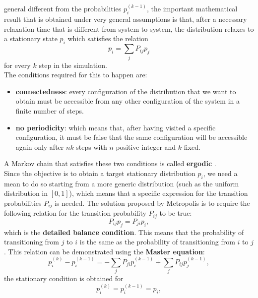 general different from the probabilities $p_i^{(k-1)}$, the important mathematical result that is obtained under very general assumptions is that, 
after a necessary relaxation time that is different from system to system, the distribution relaxes to a stationary state $p_i$ which satisfies the 
relation
\begin{equation}
    p_i=\sum_{j}P_{ij}p_j
\end{equation}
for every $k$ step in the simulation.\\
The conditions required for this to happen are:
\begin{itemize}
    \item \textbf{connectedness}: every configuration of the distribution that we want to obtain must be accessible from any other configuration of the system in a finite number of steps.
    \item \textbf{no periodicity}: which means that, after having visited a specific configuration, it must be false that the same configuration will be accessible again only after 
    $nk$ steps with $n$ positive integer and $k$ fixed.
\end{itemize}
A Markov chain that satisfies these two conditions is called \textbf{ergodic} \cite{gubernatis2016quantum}.\\
Since the objective is to obtain a target stationary distribution $p_i$, we need a mean to do so starting from a more generic distribution (such as the uniform distribution 
in $[0,1]$), which means that a specific expression for the transition probabilities $P_{ij}$ is needed. The solution proposed 
by Metropolis \cite{metropolis1953equation} is to require the following relation for the transition probability $P_{ij}$ to be true:
\begin{equation}
    P_{ij}p_j=P_{ji}p_i,
    \label{detailed_balance_condition}
\end{equation}
which is the \textbf{detailed balance condition}. This means that the probability of transitioning from $j$ to $i$ is the same as 
the probability of transitioning from $i$ to $j$. This relation can be demonstrated using the \textbf{Master equation}:
\begin{equation}
    p_i^{(k)}-p_{i}^{(k-1)}=-\sum_{j}P_{ji}p_{i}^{(k-1)}+\sum_{j}P_{ij}p_{j}^{(k-1)},
    \label{master_equation}
\end{equation}
the stationary condition is obtained for
\begin{equation}
    p_i^{(k)}=p_{i}^{(k-1)}=p_i,
\end{equation}
